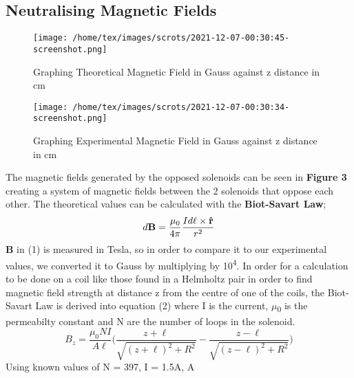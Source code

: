 \documentclass{article}
\begin{document}
   \subsection{Neutralising Magnetic Fields}
   \begin{figure}
       \centering
       \texttt{[image: /home/tex/images/scrots/2021-12-07-00:30:45-screenshot.png]}
       \caption{Graphing Theoretical Magnetic Field in Gauss against z distance in cm}
   \end{figure}
   \begin{figure}
       \centering
       \texttt{[image: /home/tex/images/scrots/2021-12-07-00:30:34-screenshot.png]}
       \caption{Graphing Experimental Magnetic Field in Gauss against z distance in cm}
   \end{figure}
   The magnetic fields generated by the opposed solenoids can be seen in \textbf{Figure 3}
   creating a system of magnetic fields between the 2 solenoids that oppose each other. The theoretical values can be calculated
   with the \textbf{Biot-Savart Law};
   \begin{equation}
       d{\bf{B}} = \frac{{\mu _0 }}{{4\pi }}\frac{{Id\ell \times {\bf{\hat r}}}}{{r^2 }}
   \end{equation}
   \textbf{B} in (1) is measured in Tesla, so in order to compare it to our experimental values, we converted it to Gauss by
   multiplying by 10\textsuperscript{4}. \newline
   In order for a calculation to be done on a coil like those found in a Helmholtz pair in order to find magnetic field strength at 
   distance z from the centre of one of the coils, the Biot-Savart Law is derived into equation (2) where I is the current, \(\mu\)\textsubscript{0} is the permeabilty 
   constant and N are the number of loops in the solenoid.
   \begin{equation}
       B_z = \frac{\mu _0 N I}{A \ell}\bigg( \frac{z + \ell}{\sqrt{(z + \ell)^2 + R^2}} - \frac{z - \ell}{\sqrt{(z - \ell)^2 + R^2}}\bigg)
   \end{equation}
   Using known values of N = 397, I = 1.5A, A
\end{document}
